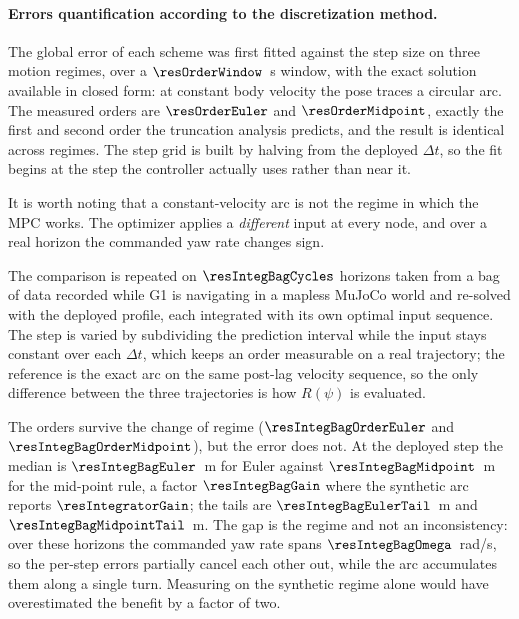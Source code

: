 \documentclass[11pt,a4paper]{article}
\begin{document}
\paragraph{Errors quantification according to the discretization method.} The global error of each scheme was first fitted against the step size
on three motion regimes, over a $\resOrderWindow$~s window, with the exact solution available in closed form:
at constant body velocity the pose traces a circular arc. The measured orders are $\resOrderEuler$ and
$\resOrderMidpoint$, exactly the first and second order the truncation analysis predicts, and the result is
identical across regimes. The step grid is built by halving from the deployed $\Delta t$, so the fit begins
at the step the controller actually uses rather than near it.

It is worth noting that a constant-velocity
arc is not the regime in which the MPC works. The optimizer applies a \emph{different} input at every node, and over a real horizon the commanded yaw rate changes sign.

The comparison is repeated on
$\resIntegBagCycles$ horizons taken from a bag of data recorded while G1 is navigating in a mapless MuJoCo world and re-solved with the deployed
profile, each integrated with its own optimal input sequence. The step is varied by subdividing the
prediction interval while the input stays constant over each $\Delta t$, which keeps an order measurable on a
real trajectory; the reference is the exact arc on the same post-lag velocity sequence, so the only
difference between the three trajectories is how $R(\psi)$ is evaluated.

\begin{table}[htbp]
  \centering
  \small
  \caption{%
  Median position error at the end of the horizon, over 12 horizons re-solved from a bag of data recorded during the navigation, against the exact arc on the same velocity sequence. The first row is the
  deployed step; the others subdivide the prediction interval without changing the input.}
  \label{res:tab:integbag}
\end{table}

The orders survive the change of regime ($\resIntegBagOrderEuler$ and $\resIntegBagOrderMidpoint$), but
the error does not. At the deployed step the median is $\resIntegBagEuler$~m for Euler against
$\resIntegBagMidpoint$~m for the mid-point rule, a factor $\resIntegBagGain$ where the synthetic arc reports
$\resIntegratorGain$; the tails are $\resIntegBagEulerTail$~m and $\resIntegBagMidpointTail$~m. The gap is
the regime and not an inconsistency: over these horizons the commanded yaw rate spans
$\resIntegBagOmega$~rad/s, so the per-step errors partially cancel each other out, while the arc accumulates them along a
single turn. Measuring on the synthetic regime alone would have overestimated the benefit by a factor of two.
\end{document}
